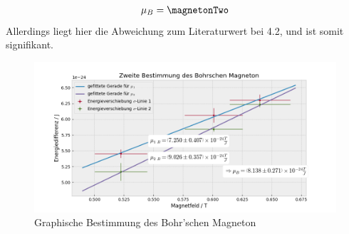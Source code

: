         \begin{align}
          \mu_B = \magnetonTwo
        \end{align}
        Allerdings liegt hier die Abweichung zum Literaturwert bei \SI{4.2}{\sigma}, und ist somit signifikant.
        \begin{figure}[H]
          \centering
          \hspace*{-1.5cm}\includegraphics[width=1.2\textwidth]{Auswertung/mu_B2}
          \caption{Graphische Bestimmung des Bohr'schen Magneton}
          \label{plot::4}
        \end{figure}
